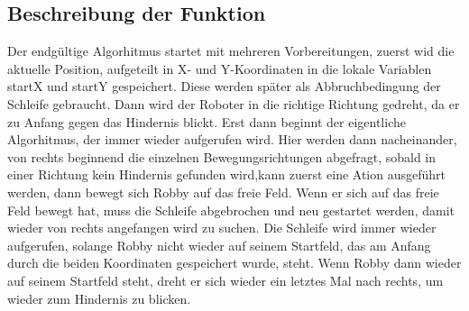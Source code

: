 \subsection*{Beschreibung der Funktion}
Der endgültige Algorhitmus startet mit mehreren Vorbereitungen, zuerst wid die aktuelle Position, aufgeteilt in X- und Y-Koordinaten in die lokale Variablen startX und startY gespeichert. Diese werden später als Abbruchbedingung der Schleife gebraucht. Dann wird der Roboter in die richtige Richtung gedreht, da er zu Anfang gegen das Hindernis blickt.
Erst dann beginnt der eigentliche Algorhitmus, der immer wieder aufgerufen wird. Hier werden dann nacheinander, von rechts beginnend die einzelnen Bewegungsrichtungen abgefragt, sobald in einer Richtung kein Hindernis gefunden wird,kann zuerst eine Ation ausgeführt werden, dann bewegt sich Robby auf das freie Feld. Wenn er sich auf das freie Feld bewegt hat, muss die Schleife abgebrochen und neu gestartet werden, damit wieder von rechts angefangen wird zu suchen. Die Schleife wird immer wieder aufgerufen, solange Robby nicht wieder auf seinem Startfeld, das am Anfang durch die beiden Koordinaten gespeichert wurde, steht.
Wenn Robby dann wieder auf seinem Startfeld steht, dreht er sich wieder ein letztes Mal nach rechts, um wieder zum Hindernis zu blicken.

